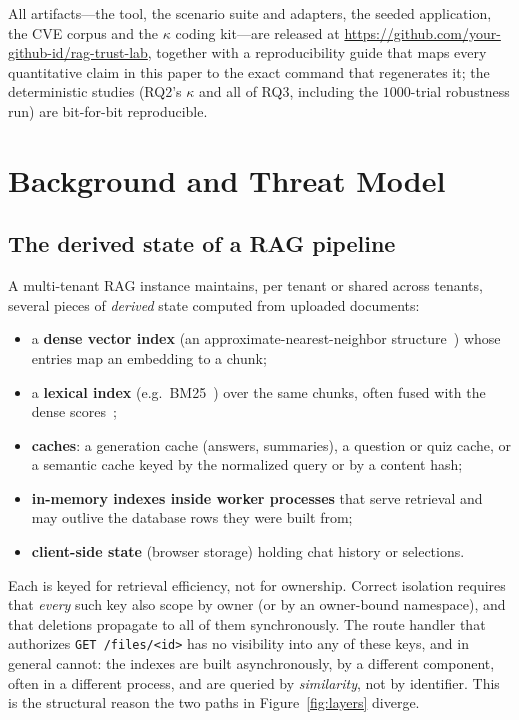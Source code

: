 \IfFileExists{IEEEtran.cls}{\documentclass[conference]{IEEEtran}}{\documentclass[10pt,twocolumn]{article}}
\newcommand{\code}[1]{\texttt{\small #1}}
\newcommand{\repourl}{\url{https://github.com/your-github-id/rag-trust-lab}}
\begin{document}
All artifacts---the tool, the scenario suite and adapters, the seeded application, the CVE corpus and
the $\kappa$ coding kit---are released at \repourl, together with a reproducibility guide that
maps every quantitative claim in this paper to the exact command that regenerates it; the
deterministic studies (RQ2's $\kappa$ and all of RQ3, including the $1000$-trial robustness run) are
bit-for-bit reproducible.

\section{Background and Threat Model}
\label{sec:threat}

\subsection{The derived state of a RAG pipeline}
A multi-tenant RAG instance maintains, per tenant or shared across tenants, several pieces of
\emph{derived} state computed from uploaded documents:
\begin{itemize}
\item a \textbf{dense vector index} (an approximate-nearest-neighbor
structure~\cite{malkov2020hnsw,johnson2021faiss}) whose entries map an embedding to a chunk;
\item a \textbf{lexical index} (e.g.\ BM25~\cite{robertson2009bm25}) over the same chunks, often
fused with the dense scores~\cite{cormack2009rrf};
\item \textbf{caches}: a generation cache (answers, summaries), a question or quiz cache, or a
semantic cache keyed by the normalized query or by a content hash;
\item \textbf{in-memory indexes inside worker processes} that serve retrieval and may outlive the
database rows they were built from;
\item \textbf{client-side state} (browser storage) holding chat history or selections.
\end{itemize}
Each is keyed for retrieval efficiency, not for ownership. Correct isolation requires that
\emph{every} such key also scope by owner (or by an owner-bound namespace), and that deletions
propagate to all of them synchronously. The route handler that authorizes \code{GET /files/<id>} has
no visibility into any of these keys, and in general cannot: the indexes are built asynchronously, by
a different component, often in a different process, and are queried by \emph{similarity}, not by
identifier. This is the structural reason the two paths in Figure~\ref{fig:layers} diverge.
\end{document}
